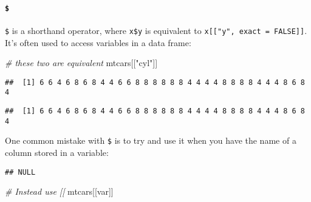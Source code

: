 \documentclass[
]{book}
\newenvironment{Shaded}{\begin{snugshade}}{\end{snugshade}}
\newcommand{\CommentTok}[1]{\textcolor[rgb]{0.56,0.35,0.01}{\textit{#1}}}
\newcommand{\NormalTok}[1]{#1}
\newcommand{\OtherTok}[1]{\textcolor[rgb]{0.56,0.35,0.01}{#1}}
\newcommand{\SpecialCharTok}[1]{\textcolor[rgb]{0.00,0.00,0.00}{#1}}
\newcommand{\StringTok}[1]{\textcolor[rgb]{0.31,0.60,0.02}{#1}}
\begin{document}
\hypertarget{section-1}{%
\paragraph{\texorpdfstring{\texttt{\$}}{\$}}\label{section-1}}

\texttt{\$} is a shorthand operator, where \texttt{x\$y} is equivalent to \texttt{x{[}{[}"y",\ exact\ =\ FALSE{]}{]}}. It's often used to access variables in a data frame:

\begin{Shaded}
\begin{Highlighting}[]
\CommentTok{\# these two are equivalent}
\NormalTok{mtcars[[}\StringTok{"cyl"}\NormalTok{]]}
\end{Highlighting}
\end{Shaded}

\begin{verbatim}
##  [1] 6 6 4 6 8 6 8 4 4 6 6 8 8 8 8 8 8 4 4 4 4 8 8 8 8 4 4 4 8 6 8 4
\end{verbatim}

\begin{Shaded}
\end{Shaded}

\begin{verbatim}
##  [1] 6 6 4 6 8 6 8 4 4 6 6 8 8 8 8 8 8 4 4 4 4 8 8 8 8 4 4 4 8 6 8 4
\end{verbatim}

One common mistake with \texttt{\$} is to try and use it when you have the name of a column stored in a variable:

\begin{Shaded}
\end{Shaded}

\begin{verbatim}
## NULL
\end{verbatim}

\begin{Shaded}
\begin{Highlighting}[]
\CommentTok{\# Instead use [[}
\NormalTok{mtcars[[var]]}
\end{Highlighting}
\end{Shaded}
\end{document}
